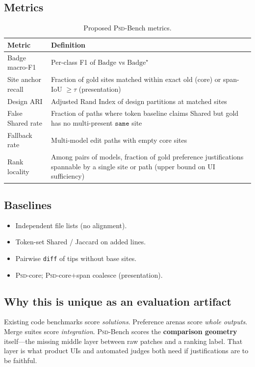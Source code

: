 \documentclass[
  11pt,
  a4paper,
  oneside,
  numbers=noenddot,
  abstract=true,
  headings=normal,
  DIV=11,
  BCOR=0mm,
]{scrartcl}
\theoremstyle{definition}
\theoremstyle{plain}
\theoremstyle{remark}
\newcommand{\PSD}{\textsc{Psd}}
\newcommand{\Badge}{\mathrm{Badge}}
\begin{document}
\subsection{Metrics}

\begin{table}[t]
\centering
\caption{Proposed \PSD{}-Bench metrics.}
\label{tab:metrics}
\begin{tabular}{@{}lp{9.2cm}@{}}
\toprule
\textbf{Metric} & \textbf{Definition} \\
\midrule
Badge macro-F1 & Per-class F1 of $\Badge$ vs $\Badge^\star$ \\
Site anchor recall & Fraction of gold sites matched within exact
  $\mathrm{old}$ (core) or span-IoU $\ge\tau$ (presentation) \\
Design ARI & Adjusted Rand Index of design partitions at matched sites \\
False Shared rate & Fraction of paths where token baseline claims Shared
  but gold has no multi-present $\texttt{same}$ site \\
Fallback rate & Multi-model edit paths with empty core sites \\
Rank locality & Among pairs of models, fraction of gold preference
  justifications spannable by a single site or path (upper bound on
  UI sufficiency) \\
\bottomrule
\end{tabular}
\end{table}

\subsection{Baselines}

\begin{itemize}
  \item Independent file lists (no alignment).
  \item Token-set Shared / Jaccard on added lines.
  \item Pairwise \texttt{diff} of tips without base sites.
  \item \PSD{}-core; \PSD{}-core$+$span coalesce (presentation).
\end{itemize}

\subsection{Why this is unique as an evaluation artifact}

Existing code benchmarks score \emph{solutions}. Preference arenas score
\emph{whole outputs}. Merge suites score \emph{integration}.
\PSD{}-Bench scores the \textbf{comparison geometry} itself---the missing
middle layer between raw patches and a ranking label. That layer is what
product UIs and automated judges both need if justifications are to be
faithful.
\end{document}
